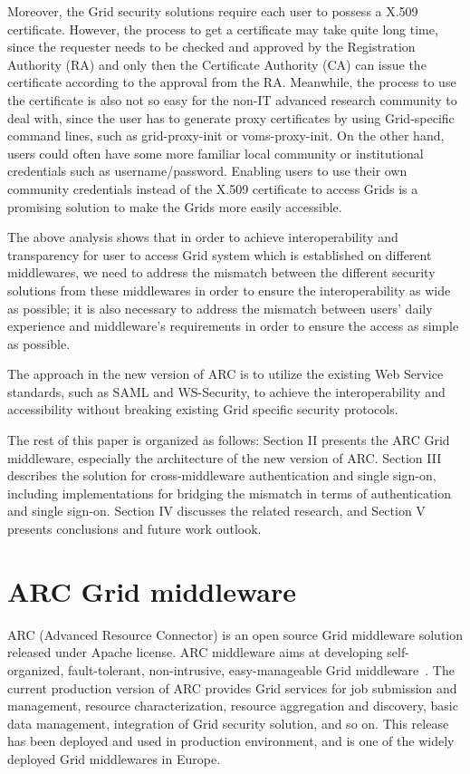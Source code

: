 \documentclass[twocolumn]{svjour3}         %
\begin{document}
Moreover, the Grid security solutions require each user to possess a X.509 certificate. However, the process to get a certificate may take quite long time, since the requester needs to be checked and approved by the Registration Authority (RA) and only then the Certificate Authority (CA) can issue the certificate according to the approval from the RA. Meanwhile, the process to use the certificate is also not so easy for the non-IT advanced research community to deal with, since the user has to generate proxy certificates by using Grid-specific command lines, such as grid-proxy-init or voms-proxy-init. On the other hand, users could often have some more familiar local community or institutional credentials such as username/password. Enabling users to use their own community credentials instead of the X.509 certificate to access Grids is a promising solution to make the Grids more easily accessible.

The above analysis shows that in order to achieve interoperability and transparency for user to access Grid system which is established on different middlewares, we need to address the mismatch between the different security solutions from these middlewares in order to ensure the interoperability as wide as possible; it is also necessary to address the mismatch between users’ daily experience and middleware’s requirements in order to ensure the access as simple as possible.

The approach in the new version of ARC is to utilize the existing Web Service standards, such as SAML and WS-Security, to achieve the interoperability and accessibility without breaking existing Grid specific security protocols.

The rest of this paper is organized as follows: Section II presents the ARC Grid middleware, especially the architecture of the new version of ARC. Section III describes the solution for cross-middleware authentication and single sign-on, including implementations for bridging the mismatch in terms of authentication and single sign-on. Section IV discusses the related research, and Section V presents conclusions and future work outlook.


\section{ARC Grid middleware}
\label{sec:arcmiddleware}
ARC (Advanced Resource Connector) is an open source Grid middleware solution released under Apache license. ARC middleware aims at developing self-organized, fault-tolerant, non-intrusive, easy-manageable Grid middleware~\cite{MEllert07}. The current production version of ARC provides Grid services for job submission and management, resource characterization, resource aggregation and discovery, basic data management, integration of Grid security solution, and so on. This release has been deployed and used in production environment, and is one of the widely deployed Grid middlewares in Europe.
\end{document}
